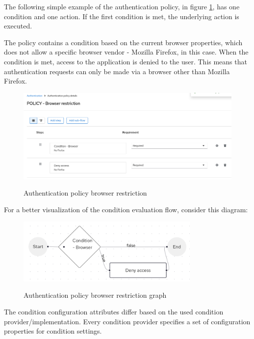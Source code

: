 The following simple example of the authentication policy, in figure \ref{fig:design-policy-browser-flow}, has one condition and one action.
If the first condition is met, the underlying action is executed.

The policy contains a condition based on the current browser properties, which does not allow a specific browser vendor - Mozilla Firefox, in this case.
When the condition is met, access to the application is denied to the user.
This means that authentication requests can only be made via a browser other than Mozilla Firefox.

\begin{figure}[htbp]
  \centering
  \includegraphics[width=1\textwidth]{img/sections/5-design/policy-browser-flow.png}
  \label{fig:design-policy-browser-flow}
  \caption{Authentication policy browser restriction}
\end{figure}

For a better visualization of the condition evaluation flow, consider this diagram:

\begin{figure}[htbp]
  \centering
  \includegraphics[width=0.8\textwidth]{img/sections/5-design/policy-browser-flow-graph.png}
  \label{fig:design-policy-browser-flow-graph}
  \caption{Authentication policy browser restriction graph}
\end{figure}

The condition configuration attributes differ based on the used condition provider/implementation.
Every condition provider specifies a set of configuration properties for condition settings.

